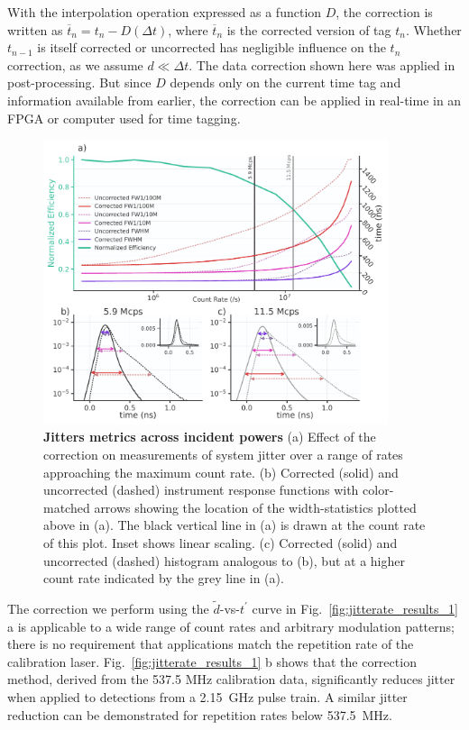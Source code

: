 \documentclass[11pt]{caltech_thesis} %
\begin{document}
With the interpolation operation expressed as a function $D$, the correction is written as $\overline{t}_n = t_n - D(\Delta t)$, where $\overline{t}_n$ is the corrected version of tag $t_n$. Whether $t_{n-1}$ is itself corrected or uncorrected has negligible influence on the $t_n$ correction, as we assume $d \ll \Delta t$. The data correction shown here was applied in post-processing. But since $D$ depends only on the current time tag and information available from earlier, the correction can be applied in real-time in an FPGA or computer used for time tagging.

\hypertarget{fig:jitterate_results_2}{%
\begin{figure}
\centering
\includegraphics[width=0.9\textwidth,height=\textheight]{./chapter_03/figs/jitterate_data_c_light.pdf}
\caption[{Jitters metrics across incident powers}]{\textbf{Jitters metrics across incident powers} (a) Effect of the correction on measurements of system jitter over a range of rates approaching the maximum count rate. (b) Corrected (solid) and uncorrected (dashed) instrument response functions with color-matched arrows showing the location of the width-statistics plotted above in (a). The black vertical line in (a) is drawn at the count rate of this plot. Inset shows linear scaling. (c) Corrected (solid) and uncorrected (dashed) histogram analogous to (b), but at a higher count rate indicated by the grey line in (a).}
\label{fig:jitterate_results_2}
\end{figure}
}

The correction we perform using the $\tilde{d}$-vs-$t^\prime$ curve in Fig.~\ref{fig:jitterate_results_1} a is applicable to a wide range of count rates and arbitrary modulation patterns; there is no requirement that applications match the repetition rate of the calibration laser. Fig.~\ref{fig:jitterate_results_1} b shows that the correction method, derived from the 537.5 MHz calibration data, significantly reduces jitter when applied to detections from a 2.15~GHz pulse train. A similar jitter reduction can be demonstrated for repetition rates below 537.5~MHz.
\end{document}
